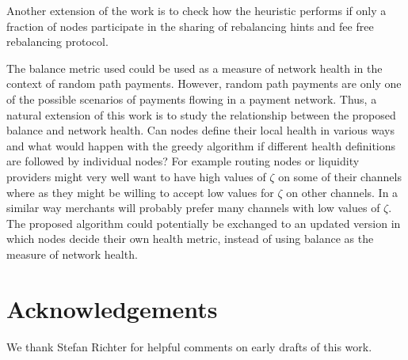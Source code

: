 \documentclass[a4paper]{paper}
\begin{document}
Another extension of the work is to check how the heuristic performs if only a fraction of nodes participate in the sharing of rebalancing hints and fee free rebalancing protocol.

The balance metric used could be used as a measure of network health in the context of random path payments. 
However, random path payments are only one of the possible scenarios of payments flowing in a payment network. 
Thus, a natural extension of this work is to 
study the relationship between the proposed balance and network health. Can nodes define their local health in various ways and what would happen with the greedy algorithm if different health definitions are followed by individual nodes?
For example routing nodes or liquidity providers might very well want to have high values of $\zeta$ on some of their channels where as they might be willing to accept low values for $\zeta$ on other channels.
In a similar way merchants will probably prefer many channels with low values of $\zeta$.
The proposed algorithm could potentially be exchanged to an updated version in which nodes decide their own health metric,
instead of using balance as the measure of network health.


\section{Acknowledgements}
\label{sec:ack}
We thank Stefan Richter for helpful comments on early drafts of this work.




\end{document}
